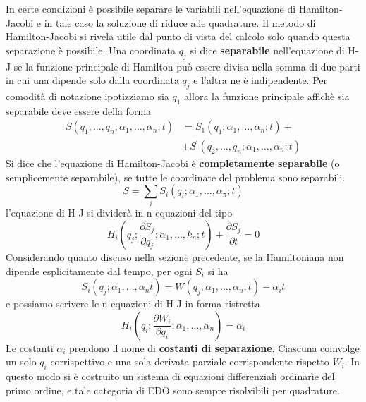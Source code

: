 In certe condizioni \`{e} possibile separare le variabili nell'equazione di Hamilton-Jacobi e in tale caso la soluzione di riduce alle quadrature. Il metodo di Hamilton-Jacobi si rivela utile dal punto di vista del calcolo solo quando questa separazione \`{e} possibile. Una coordinata $q_j$ si dice \textbf{separabile} nell'equazione di H-J se la funzione principale di Hamilton pu\`{o} essere divisa nella somma di due parti in cui una dipende solo dalla coordinata $q_j$ e l'altra ne \`{e} indipendente. Per comodit\`{a} di notazione ipotizziamo sia $q_1$ allora la funzione principale affich\`{e} sia separabile deve essere della forma
\begin{equation}
\begin{aligned}
S\left(q_1, \ldots, q_n ; \alpha_1, \ldots, \alpha_n ; t\right) & =S_1\left(q_1 ; \alpha_1, \ldots, \alpha_n ; t\right)+ \\
& +S^{\prime}\left(q_2, \ldots, q_n ; \alpha_1, \ldots, \alpha_n ; t\right)
\end{aligned}
\end{equation}
Si dice che l'equazione di Hamilton-Jacobi \`{e} \textbf{completamente separabile} (o semplicemente separabile), se tutte le coordinate del problema sono separabili.
\begin{equation}
S=\sum_i S_i\left(q_i ; \alpha_1, \ldots, \alpha_\pi ; t\right)
\end{equation}
l'equazione di H-J si divider\`{a} in n equazioni del tipo
\begin{equation}
H_i\left(q_j ; \frac{\partial S_j}{\partial q_j} ; \alpha_1, \ldots, k_n ; t\right)+\frac{\partial S_j}{\partial t}=0
\end{equation}
Considerando quanto discuso nella sezione precedente, se la Hamiltoniana non dipende esplicitamente dal tempo, per ogni $S_i$ si ha 
\begin{equation}
S_i\left(q_j ; \alpha_1, \ldots, \alpha_n t\right)=W\left(q_j ; \alpha_1, \ldots, \alpha_n ; t\right)-\alpha_i t
\end{equation}
e possiamo scrivere le n equazioni di H-J in forma ristretta 
\begin{equation}
H_i\left(q_i ; \frac{\partial W_i}{\partial q_i} ; \alpha_1, \ldots, \alpha_n\right)=\alpha_i
\end{equation}
Le costanti $\alpha_i$ prendono il nome di \textbf{costanti di separazione}. Ciascuna coinvolge un solo $q_i$ corrispettivo e una sola derivata parziale corrispondente rispetto $W_i$. In questo modo si \`{e} costruito un sistema di equazioni differenziali ordinarie del primo ordine, e tale categoria di EDO sono sempre risolvibili per quadrature.

